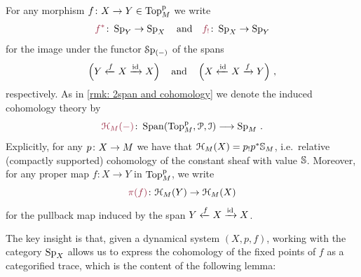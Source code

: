 \begin{notation}
For any morphism $f\colon X\to Y \in \mathrm{Top}^{\mathrm{p}}_{M}$ we write 
\[ \mdef{f^*}\colon \pSp{Y}\to \pSp{X}\quad \text{and}\quad  \mdef{f_!} \colon \pSp{X}\to \pSp{Y}\]
for the image under the functor $\pSpf{(-)}$ of the spans 
\[ \left( Y \xleftarrow{f} X \xrightarrow{\operatorname{id}}X\right) \quad \text{and} \quad  \left(X \xleftarrow{\operatorname{id}} X \xrightarrow{f} Y \right)\,, \]
respectively. As in \cref{rmk: 2span and cohomology} we denote
the induced cohomology theory by 
\[ \mdef{\cptSec{-}[\base]}\colon \Span{\pTop{\base},\cP, \cI}\too \pSp{\base}\,.\]
Explicitly, for any $p\colon X\to M$ we have that 
$\cptSec{X}[\base] =  p_!p^*\SS_{\base}$, i.e.~relative (compactly supported) cohomology
of the constant sheaf with value $\mathbb{S}$.
Moreover, for any proper map $f\colon X\to Y$ in $\mathrm{Top}^{\mathrm{p}}_{M}$, we write 
\[ \mdef{\pi(f)}\colon \cptSec{Y}[\base]\to \cptSec{X}[\base]\]
for the pullback map induced by the span $Y \xleftarrow{f}X \xrightarrow{\operatorname{id}} X$. 
\end{notation}
%
%
The key insight is that, given a dynamical system $(X,p,f)$, working with the category
$\pSp{X}$ allows us to express the cohomology of the fixed points of $f$ as a categorified
trace, which is the content of the following lemma:

